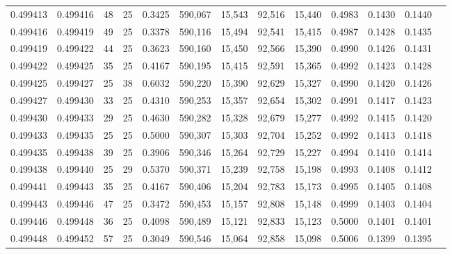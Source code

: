 \begin{tabular}{rrrrrrrrrrrrr}
0.499413 & 0.499416 &    48 &  25 &                                     0.3425 & 590,067 &  15,543 &  92,516 &  15,440 & 0.4983 & 0.1430 & 0.1440 \\
0.499416 & 0.499419 &    49 &  25 &                                     0.3378 & 590,116 &  15,494 &  92,541 &  15,415 & 0.4987 & 0.1428 & 0.1435 \\
0.499419 & 0.499422 &    44 &  25 &                                     0.3623 & 590,160 &  15,450 &  92,566 &  15,390 & 0.4990 & 0.1426 & 0.1431 \\
0.499422 & 0.499425 &    35 &  25 &                                     0.4167 & 590,195 &  15,415 &  92,591 &  15,365 & 0.4992 & 0.1423 & 0.1428 \\
0.499425 & 0.499427 &    25 &  38 &                                     0.6032 & 590,220 &  15,390 &  92,629 &  15,327 & 0.4990 & 0.1420 & 0.1426 \\
0.499427 & 0.499430 &    33 &  25 &                                     0.4310 & 590,253 &  15,357 &  92,654 &  15,302 & 0.4991 & 0.1417 & 0.1423 \\
0.499430 & 0.499433 &    29 &  25 &                                     0.4630 & 590,282 &  15,328 &  92,679 &  15,277 & 0.4992 & 0.1415 & 0.1420 \\
0.499433 & 0.499435 &    25 &  25 &                                     0.5000 & 590,307 &  15,303 &  92,704 &  15,252 & 0.4992 & 0.1413 & 0.1418 \\
0.499435 & 0.499438 &    39 &  25 &                                     0.3906 & 590,346 &  15,264 &  92,729 &  15,227 & 0.4994 & 0.1410 & 0.1414 \\
0.499438 & 0.499440 &    25 &  29 &                                     0.5370 & 590,371 &  15,239 &  92,758 &  15,198 & 0.4993 & 0.1408 & 0.1412 \\
0.499441 & 0.499443 &    35 &  25 &                                     0.4167 & 590,406 &  15,204 &  92,783 &  15,173 & 0.4995 & 0.1405 & 0.1408 \\
0.499443 & 0.499446 &    47 &  25 &                                     0.3472 & 590,453 &  15,157 &  92,808 &  15,148 & 0.4999 & 0.1403 & 0.1404 \\
0.499446 & 0.499448 &    36 &  25 &                                     0.4098 & 590,489 &  15,121 &  92,833 &  15,123 & 0.5000 & 0.1401 & 0.1401 \\
0.499448 & 0.499452 &    57 &  25 &                                     0.3049 & 590,546 &  15,064 &  92,858 &  15,098 & 0.5006 & 0.1399 & 0.1395 \\

\end{tabular}
